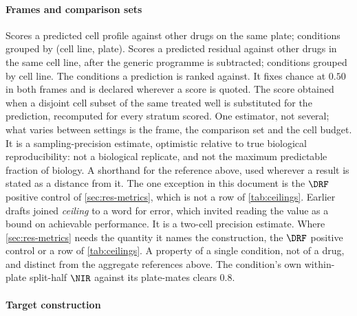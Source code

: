 \paragraph{Frames and comparison sets}

\begin{description}[leftmargin=1em, itemsep=0.5ex,
                    font=\normalfont\bfseries]
 Scores a predicted cell profile against
  other drugs on the same plate; conditions grouped by (cell line, plate).
 Scores a predicted residual against other
  drugs in the same cell line, after the generic programme is subtracted;
  conditions grouped by cell line.
 The conditions a prediction is ranked
  against. It fixes chance at $0.50$ in both frames and is declared wherever a
  score is quoted.
 The score
  obtained when a disjoint cell subset of the same treated well is substituted
  for the prediction, recomputed for every stratum scored. One estimator, not
  several; what varies between settings is the frame, the comparison set and the
  cell budget. It is a sampling-precision estimate, optimistic relative to true
  biological reproducibility: not a biological replicate, and not the maximum
  predictable fraction of biology.
 A shorthand for the reference above, used wherever a
  result is stated as a distance from it. The one exception in this document is
  the $\DRF$ positive control of \cref{sec:res-metrics}, which is not a row of
  \cref{tab:ceilings}.
 Earlier drafts joined
  \emph{ceiling} to a word for error, which invited reading the value as a
  bound on achievable performance. It is a two-cell precision estimate. Where
  \cref{sec:res-metrics} needs the quantity it names the construction, the
  $\DRF$ positive control or a row of \cref{tab:ceilings}.
 A property of a single condition, not
  of a drug, and distinct from the aggregate references above. The
  condition's own within-plate split-half $\NIR$ against its plate-mates clears
  $0.8$.
\end{description}

\paragraph{Target construction}

